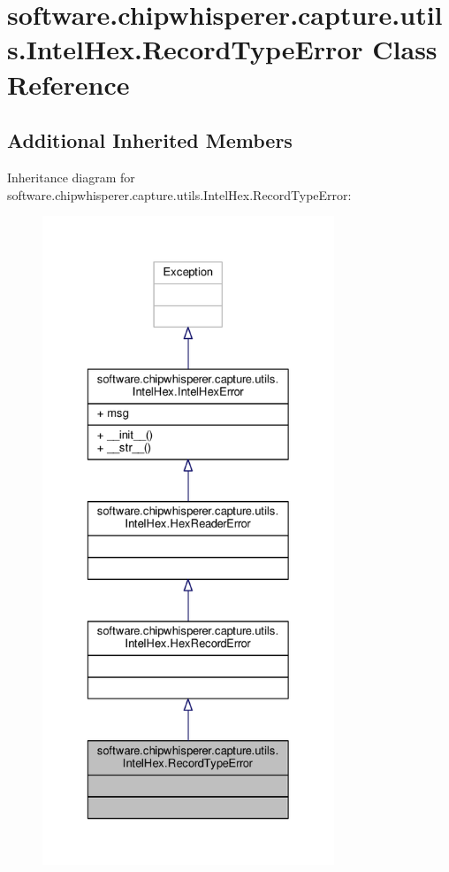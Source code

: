 \hypertarget{classsoftware_1_1chipwhisperer_1_1capture_1_1utils_1_1IntelHex_1_1RecordTypeError}{}\section{software.\+chipwhisperer.\+capture.\+utils.\+Intel\+Hex.\+Record\+Type\+Error Class Reference}
\label{classsoftware_1_1chipwhisperer_1_1capture_1_1utils_1_1IntelHex_1_1RecordTypeError}
\subsection*{Additional Inherited Members}


Inheritance diagram for software.\+chipwhisperer.\+capture.\+utils.\+Intel\+Hex.\+Record\+Type\+Error\+:\nopagebreak
\begin{figure}[H]
\begin{center}
\leavevmode
\includegraphics[height=550pt]{df/dea/classsoftware_1_1chipwhisperer_1_1capture_1_1utils_1_1IntelHex_1_1RecordTypeError__inherit__graph}
\end{center}
\end{figure}


